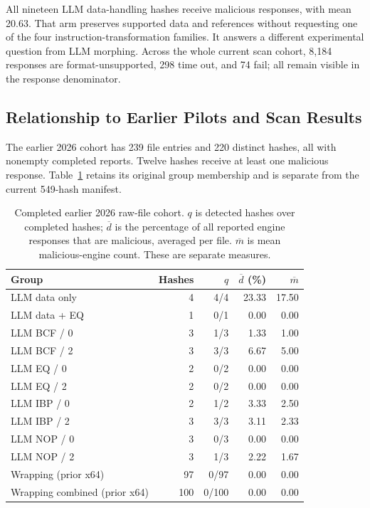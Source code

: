 All nineteen LLM data-handling hashes receive malicious responses, with
mean 20.63. That arm preserves supported data and references without
requesting one of the four instruction-transformation families. It answers
a different experimental question from LLM morphing. Across the whole
current scan cohort, 8,184 responses are format-unsupported, 298 time out,
and 74 fail; all remain visible in the response denominator.

\subsection{Relationship to Earlier Pilots and Scan Results}
The earlier 2026 cohort has 239 file entries and 220 distinct hashes,
all with nonempty completed reports. Twelve hashes receive at least one
malicious response. Table~\ref{tab:new_vt_cohort} retains its original group
membership and is separate from the current 549-hash manifest.


\begin{table}[t]
\caption{Completed earlier 2026 raw-file cohort. $q$ is detected hashes
over completed hashes; $\overline d$ is the percentage of all reported
engine responses that are malicious, averaged per file. $\overline m$
is mean malicious-engine count. These are separate measures.}
\label{tab:new_vt_cohort}
\centering\small\setlength{\tabcolsep}{4pt}
\begin{tabular}{@{}lrrrr@{}}
\toprule
Group & Hashes & $q$ & $\overline d$ (\%) & $\overline m$ \\
\midrule
LLM data only & 4 & 4/4 & 23.33 & 17.50 \\
LLM data + EQ & 1 & 0/1 & 0.00 & 0.00 \\
LLM BCF / 0 & 3 & 1/3 & 1.33 & 1.00 \\
LLM BCF / 2 & 3 & 3/3 & 6.67 & 5.00 \\
LLM EQ / 0 & 2 & 0/2 & 0.00 & 0.00 \\
LLM EQ / 2 & 2 & 0/2 & 0.00 & 0.00 \\
LLM IBP / 0 & 2 & 1/2 & 3.33 & 2.50 \\
LLM IBP / 2 & 3 & 3/3 & 3.11 & 2.33 \\
LLM NOP / 0 & 3 & 0/3 & 0.00 & 0.00 \\
LLM NOP / 2 & 3 & 1/3 & 2.22 & 1.67 \\
Wrapping (prior x64) & 97 & 0/97 & 0.00 & 0.00 \\
Wrapping combined (prior x64) & 100 & 0/100 & 0.00 & 0.00 \\
\bottomrule
\end{tabular}
\end{table}


